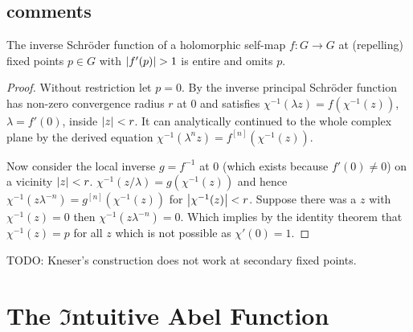 \documentclass{article}
\numberwithin{equation}{section}
\begin{document}
\subsection{comments}
\begin{proposition}
  The inverse Schröder function of a holomorphic self-map $f\colon G\to G$ at
  (repelling) fixed points $p\in G$ with $\abs{f'(p)}>1$
  is entire and omits $p$.
\end{proposition}
\begin{proof}
  Without restriction let $p=0$. By 
  the inverse principal Schröder function has non-zero convergence radius $r$
  at $0$ and satisfies 
  $\chi^{-1}(\lambda z)=f(\chi^{-1}(z))$, $\lambda=f'(0)$, inside $\left|z\right|<r$. It can
  analytically continued to the whole complex plane by the derived
  equation $\chi^{-1}(\lambda^nz)=f^{[n]}(\chi^{-1}(z))$.

  Now consider the local inverse $g=f^{-1}$ at 0 (which exists because
  $f'(0)\neq 0$) 
  on a vicinity $\left|z\right|<r$. 
  $\chi^{-1}(z/\lambda)=g(\chi^{-1}(z))$ and
  hence $\chi^{-1}(z\lambda^{-n})=g^{[n]}(\chi^{-1}(z))$ for
  $\left|\chi^{-1}(z)\right|<r$.
  Suppose there was a $z$ with $\chi^{-1}(z)=0$ then
  $\chi^{-1}(z\lambda^{-n})=0$. Which implies by the identity theorem
  that $\chi^{-1}(z)=p$ for all $z$ which is not possible as
  $\chi'(0)=1$.
\end{proof}
TODO: Kneser's construction does not work at secondary fixed points.
\section{The $\mathfrak{I}$ntuitive Abel Function}\label{sec:Intuitive Abel}
\end{document}
